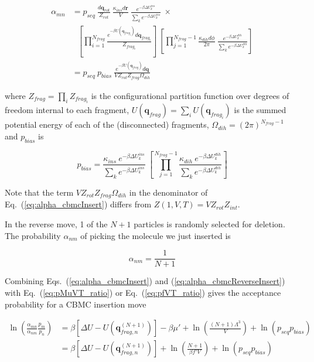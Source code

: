 \begin{align}
\alpha_{mn} &= p_{seq}\ \frac{d\mathbf{q}_{rot}}{Z_{rot}}\ \frac{\kappa_{ins}d\mathbf{r}}{V}\ \frac{e^{-\beta \Delta U_k^{ins}}}{\sum_k{e^{-\beta \Delta U_k^{ins}}}}\ \times \nonumber \\
&\ \ \ \left[\prod_{i=1}^{N_{frag}}{\frac{e^{-\beta U(\mathbf{q}_{frag_i})}d\mathbf{q}_{frag_i}}{Z_{frag_i}}}\right]\ \left[\prod_{j=1}^{N_{frag}-1}{\frac{\kappa_{dih}d\phi}{2\pi}\ \frac{e^{-\beta \Delta U_k^{dih}}}{\sum_k{e^{-\beta \Delta U_k^{dih}}}}}\right] \\
\label{eq:alpha_cbmcInsert}
&= p_{seq}\ p_{bias}\ \frac{e^{-\beta U(\mathbf{q}_{frag})}d\mathbf{q}}{VZ_{rot}Z_{frag}\Omega_{dih}}
\end{align}

where $Z_{frag} = \prod_i Z_{frag_i}$ is the configurational partition function over degrees of freedom internal to each fragment, $U(\mathbf{q}_{frag}) = \sum_iU(\mathbf{q}_{frag_i})$ is the summed potential energy of each of the (disconnected) fragments, $\Omega_{dih} = (2\pi)^{N_{frag}-1}$ and $p_{bias}$ is

\begin{equation}
\label{eq:p_bias}
p_{bias} = \frac{\kappa_{ins}\ e^{-\beta \Delta U_k^{ins}}}{\sum_k{e^{-\beta \Delta U_k^{ins}}}}\ \left[\prod_{j=1}^{N_{frag}-1}{\frac{\kappa_{dih}\ e^{-\beta \Delta U_k^{dih}}}{\sum_k{e^{-\beta \Delta U_k^{dih}}}}}\right]
\end{equation}

Note that the term $VZ_{rot}Z_{frag}\Omega_{dih}$ in the denominator of Eq.\ (\ref{eq:alpha_cbmcInsert}) differs from $Z(1,V,T)=VZ_{rot}Z_{int}$.

In the reverse move, 1 of the $N+1$ particles is randomly selected for deletion. The probability $\alpha_{nm}$ of picking the molecule we just inserted is

\begin{equation}
\label{eq:alpha_cbmcReverseInsert}
\alpha_{nm} = \frac{1}{N+1}
\end{equation}

Combining Eqs.\ (\ref{eq:alpha_cbmcInsert}) and (\ref{eq:alpha_cbmcReverseInsert}) with Eq.\ (\ref{eq:pMuVT_ratio}) or Eq.\ (\ref{eq:pfVT_ratio}) gives the acceptance probability for a CBMC insertion move

\begin{align}
\label{eq:pAcc_cbmcInsertMuShift}
\ln\left( \frac{\alpha_{mn}}{\alpha_{nm}} \frac{p_m}{p_n} \right) &= \beta \left[\Delta U - U(\mathbf{q}^{(N+1)}_{frag,n})\right] - \beta \mu' + \ln\left( \frac{(N+1)\Lambda^3}{V} \right) + \ln\left( p_{seq}p_{bias} \right) \\
\label{eq:pAcc_cbmcInsertFShift}
&= \beta \left[\Delta U - U(\mathbf{q}^{(N+1)}_{frag,n})\right] + \ln\left( \frac{N+1}{\beta f' V} \right) + \ln\left( p_{seq}p_{bias} \right)
\end{align}

